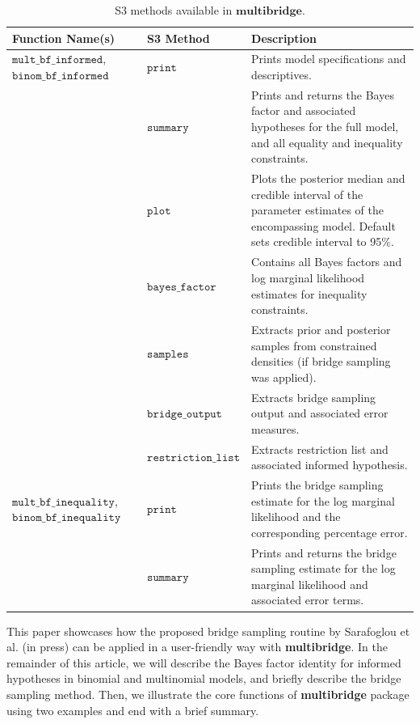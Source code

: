 \documentclass[
  english,
  man,floatsintext]{apa6}
\begin{document}
\begin{table}[H]
\caption {S3 methods available in $\textbf{multibridge}$.}
\label{table:s3_methods}
\begin{center}
\begin{tabular}{p{4cm}p{3.5cm}p{9cm}}
        \toprule
Function Name(s) & S3 Method & Description \\\midrule
$\texttt{mult\_bf\_informed}$, $\texttt{binom\_bf\_informed}$ & $\texttt{print}$ & Prints model specifications and descriptives. \\
 & $\texttt{summary}$ &  Prints and returns the Bayes factor and associated hypotheses for the full model, and all equality and inequality constraints.\\
  & $\texttt{plot}$ & Plots the posterior median and credible interval of the parameter estimates of the encompassing model. Default sets credible interval to 95\%.\\
 & $\texttt{bayes\_factor}$ & Contains all Bayes factors and log marginal likelihood estimates for inequality constraints.\\
 & $\texttt{samples}$ & Extracts prior and posterior samples from constrained densities (if bridge sampling was applied). \\
& $\texttt{bridge\_output}$  &  Extracts bridge sampling output and associated error measures.\\
& $\texttt{restriction\_list}$ & Extracts restriction list and associated informed hypothesis. \\
$\texttt{mult\_bf\_inequality}$, $\texttt{binom\_bf\_inequality}$  & $\texttt{print}$ & Prints the bridge sampling estimate for the log marginal likelihood and the corresponding percentage error. \\
& $\texttt{summary}$ & Prints and returns the bridge sampling estimate for the log marginal likelihood and associated error terms.\\
\bottomrule
\end{tabular}
\end{center}
\end{table}

\noindent This paper showcases how the proposed bridge sampling routine by Sarafoglou et al. (in press) can be applied in a user-friendly way with \textbf{multibridge}. In the remainder of this article, we will describe the Bayes factor identity for informed hypotheses in binomial and multinomial models, and briefly describe the bridge sampling method. Then, we illustrate the core functions of \textbf{multibridge} package using two examples and end with a brief summary.
\end{document}
